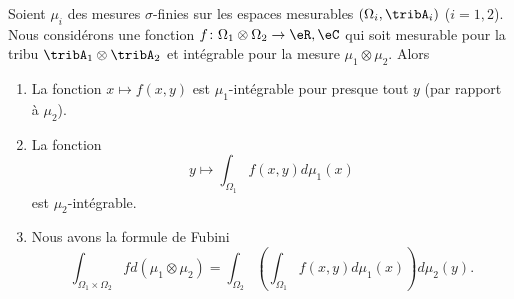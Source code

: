 \begin{theorem}
    Soient \( \mu_i\) des mesures \( \sigma\)-finies sur les espaces mesurables \( (\Omega_i,\tribA_i)\) ($i=1,2$). Nous considérons une fonction \( f\colon \Omega_1\otimes\Omega_2\to \eR,\eC\) qui soit mesurable pour la tribu \( \tribA_1\otimes \tribA_2\) et intégrable pour la mesure \( \mu_1\otimes \mu_2\). Alors
    \begin{enumerate}
        \item
            La fonction \( x\mapsto f(x,y)\) est \( \mu_1\)-intégrable pour presque tout \( y\) (par rapport à \( \mu_2\)).
        \item
            La fonction
            \begin{equation}
                y\mapsto\int_{\Omega_1}f(x,y)d\mu_1(x)
            \end{equation}
            est \( \mu_2\)-intégrable. 
        \item
            Nous avons la formule de Fubini
            \begin{equation}
                \int_{\Omega_1\times\Omega_2}fd(\mu_1\otimes\mu_2)=\int_{\Omega_2}\left( \int_{\Omega_1}f(x,y)d\mu_1(x)\right)d\mu_2(y).
            \end{equation}
    \end{enumerate}
\end{theorem}

